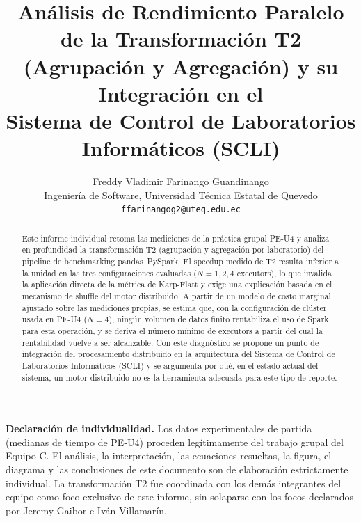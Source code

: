 \documentclass[10pt,journal]{IEEEtran}
\begin{document}
\vspace{1em}
\noindent\textbf{Declaraci\'on de individualidad.} Los datos experimentales de
partida (medianas de tiempo de PE-U4) proceden leg\'itimamente del trabajo
grupal del Equipo C. El an\'alisis, la interpretaci\'on, las ecuaciones
resueltas, la figura, el diagrama y las conclusiones de este documento son de
elaboraci\'on estrictamente individual. La transformaci\'on T2 fue coordinada
con los dem\'as integrantes del equipo como foco exclusivo de este informe,
sin solaparse con los focos declarados por Jeremy Gaibor e Iv\'an Villamar\'in.

\clearpage
\twocolumn

\title{An\'alisis de Rendimiento Paralelo de la Transformaci\'on T2\\
(Agrupaci\'on y Agregaci\'on) y su Integraci\'on en el\\
Sistema de Control de Laboratorios Inform\'aticos (SCLI)}
\author{Freddy Vladimir Farinango Guandinango\\
\small Ingenier\'ia de Software, Universidad T\'ecnica Estatal de Quevedo\\
\small \texttt{ffarinangog2@uteq.edu.ec}}
\date{}
\maketitle

\begin{abstract}
Este informe individual retoma las mediciones de la pr\'actica grupal PE-U4 y
analiza en profundidad la transformaci\'on T2 (agrupaci\'on y agregaci\'on por
laboratorio) del pipeline de benchmarking pandas--PySpark. El speedup medido
de T2 resulta inferior a la unidad en las tres configuraciones evaluadas
($N=1,2,4$ executors), lo que invalida la aplicaci\'on directa de la m\'etrica
de Karp-Flatt y exige una explicaci\'on basada en el mecanismo de shuffle del
motor distribuido. A partir de un modelo de costo marginal ajustado sobre las
mediciones propias, se estima que, con la configuraci\'on de cl\'uster usada en
PE-U4 ($N=4$), ning\'un volumen de datos finito rentabiliza el uso de Spark
para esta operaci\'on, y se deriva el n\'umero m\'inimo de executors a partir
del cual la rentabilidad vuelve a ser alcanzable. Con este diagn\'ostico se
propone un punto de integraci\'on del procesamiento distribuido en la
arquitectura del Sistema de Control de Laboratorios Inform\'aticos (SCLI) y se
argumenta por qu\'e, en el estado actual del sistema, un motor distribuido no
es la herramienta adecuada para este tipo de reporte.
\end{abstract}
\end{document}
